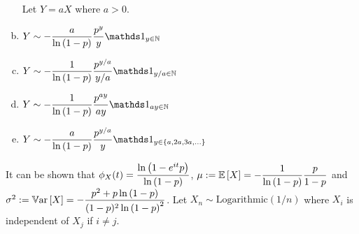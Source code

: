 \documentclass[12pt,landscape]{article}
\newcommand{\instr}{\small Your answer will consist of a lowercase string (e.g. \texttt{aebgd}) where the order of the letters does not matter. \normalsize}
\begin{document}
\begin{multicols}{2}
\begin{enumerate}[(a)]
Let $Y = aX$ where $a > 0$.

\item $Y \sim -\displaystyle\frac{a}{\natlog{1-p}}\frac{p^y}{y} \indic{y \in \naturals}$
\item $Y \sim -\displaystyle\oneover{\natlog{1-p}}\frac{p^{y/a}}{y/a} \indic{y/a \in \naturals}$
\item $Y \sim -\displaystyle\oneover{\natlog{1-p}}\frac{p^{ay}}{ay} \indic{ay \in \naturals}$
\item $Y \sim -\displaystyle\frac{a}{\natlog{1-p}}\frac{p^{y/a}}{y} \indic{y \in \braces{a, 2a, 3a, \ldots}}$


\end{enumerate}
\end{multicols}

\eenum\pagebreak


%
%


\problem{}  It can be shown that $\phi_X(t) = \displaystyle\frac{\ln\left(1-e^{it}p\right)}{\ln\left(1-p\right)}$, $\mu := \mathbb{E}\left[X\right] = -\displaystyle\frac{1}{\ln\left(1-p\right)}\frac{p}{1-p}$ and $\sigma^2 := \mathbb{V}\text{ar}\left[X\right] = -\displaystyle\frac{p^2 + p \ln\left(1-p\right)}{(1-p)^2 \ln\left(1-p\right)^2}$. Let $X_n \sim \text{Logarithmic}(1/n)$ where $X_i$ is independent of $X_j$ if $i \neq j$.
\end{document}
